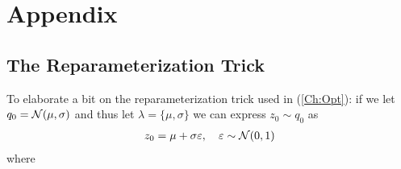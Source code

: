 \appendix
\section{Appendix}

\subsection{The Reparameterization Trick}\label{app:reparameterization}
To elaborate a bit on the reparameterization trick used in (\ref{Ch:Opt}): if we let $q_0=\mathcal{N}(\mu,\sigma)$ and thus let $\lambda=\{\mu,\sigma\}$ we can express $z_0 \sim q_0$ as 
\begin{align*}
    z_0 = \mu + \sigma \varepsilon, \quad \varepsilon \sim \mathcal{N}(0, 1) 
\end{align*}
where 


